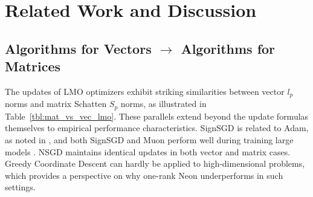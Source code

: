 \documentclass[a4paper,14pt,oneside]{extarticle}
\newcommand{\tableref}[1]{Table~\ref{#1}}
\begin{document}
\section{Related Work and Discussion}

\subsection{Algorithms for Vectors $\rightarrow$ Algorithms for Matrices}

The updates of LMO optimizers exhibit striking similarities between vector $l_p$ norms and matrix Schatten $S_p$ norms, as illustrated in \tableref{tbl:mat_vs_vec_lmo}. These parallels extend beyond the update formulas themselves to empirical performance characteristics. SignSGD is related to Adam, as noted in \citep{bernstein2024oldoptimizernewnorm}, and both SignSGD and Muon perform well during training large models \citep{zhao2025deconstructing,liu2025muonscalablellmtraining}. NSGD maintains identical updates in both vector and matrix cases. Greedy Coordinate Descent can hardly be applied to high-dimensional problems, which provides a perspective on why one-rank Neon underperforms in such settings.
\end{document}
